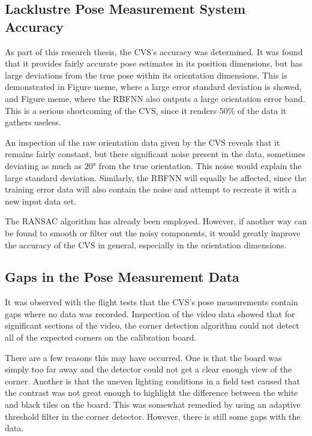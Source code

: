\subsection{Lacklustre Pose Measurement System Accuracy}

As part of this research thesis, the CVS's accuracy was determined. It was found that it provides fairly accurate pose estimates in its position dimensions, but has large deviations from the true pose within its orientation dimensions. This is demonstrated in Figure meme, where a large error standard deviation is showed, and Figure meme, where the RBFNN also outputs a large orientation error band. This is a serious shortcoming of the CVS, since it renders 50\% of the data it gathers useless. 

An inspection of the raw orientation data given by the CVS reveals that it remains fairly constant, but there significant noise present in the data, sometimes deviating as much as $\ang{20}$ from the true orientation. This noise would explain the large standard deviation. Similarly, the RBFNN will equally be affected, since the training error data will also contain the noise and attempt to recreate it with a new input data set. 

The RANSAC algorithm has already been employed. However, if another way can be found to smooth or filter out the noisy components, it would greatly improve the accuracy of the CVS in general, especially in the orientation dimensions. 

\subsection{Gaps in the Pose Measurement Data}

It was observed with the flight tests that the CVS's pose measurements contain gaps where no data was recorded. Inspection of the video data showed that for significant sections of the video, the corner detection algorithm could not detect all of the expected corners on the calibration board. 

There are a few reasons this may have occurred. One is that the board was simply too far away and the detector could not get a clear enough view of the corner. Another is that the uneven lighting conditions in a field test caused that the contrast was not great enough to highlight the difference between the white and black tiles on the board. This was somewhat remedied by using an adaptive threshold filter in the corner detector. However, there is still some gaps with the data. 

